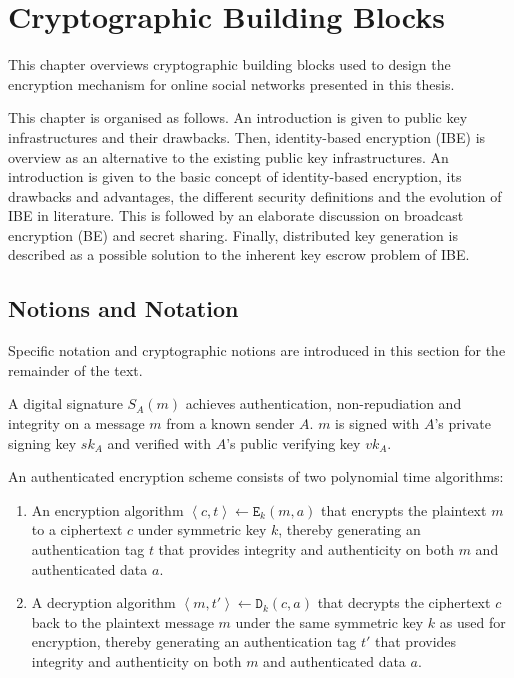 \chapter{Cryptographic Building Blocks}
\label{cha:2}
This chapter overviews cryptographic building blocks used to design the encryption mechanism for online social networks presented in this thesis.

This chapter is organised as follows. An introduction is given to public key infrastructures and their drawbacks. Then, identity-based encryption (IBE) is overview as an alternative to the existing public key infrastructures. An introduction is given to the basic concept of identity-based encryption, its drawbacks and advantages, the different security definitions and the evolution of IBE in literature. This is followed by an elaborate discussion on broadcast encryption (BE) and secret sharing. Finally, distributed key generation is described as a possible solution to the inherent key escrow problem of IBE.

\section{Notions and Notation}
Specific notation and cryptographic notions are introduced in this section for the remainder of the text.

\begin{defn}
\label{def:digital_signature}
 A digital signature $S_A \left( m \right)$ achieves authentication, non-repudiation and integrity on a message $m$ from a known sender $A$. $m$ is signed with $A$'s private signing key $sk_A$ and verified with $A$'s public verifying key $vk_A$.
\end{defn}

\begin{defn}
\label{def:authenticated_encryption}
 An authenticated encryption scheme consists of two polynomial time algorithms:
 \begin{enumerate}
   \item An encryption algorithm $\left< c,t \right> \leftarrow \mathtt{E}_k \left( m, a\right)$ that encrypts the plaintext $m$ to a ciphertext $c$ under symmetric key $k$, thereby generating an authentication tag $t$ that provides integrity and authenticity on both $m$ and authenticated data $a$.
   \item A decryption algorithm $\left< m,t' \right> \leftarrow \mathtt{D}_k \left( c,a \right)$ that decrypts the ciphertext $c$ back to the plaintext message $m$ under the same symmetric key $k$ as used for encryption, thereby generating an authentication tag $t'$ that provides integrity and authenticity on both $m$ and authenticated data $a$.
 \end{enumerate}
\end{defn}

